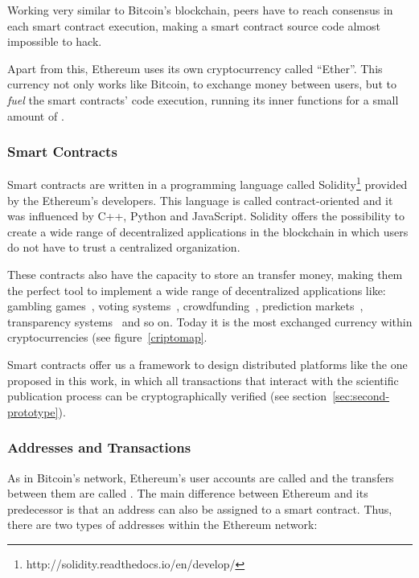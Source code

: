 Working very similar to Bitcoin's blockchain, peers have to reach consensus in
each smart contract execution, making a smart contract source code almost
impossible to hack.

Apart from this, Ethereum uses its own cryptocurrency called ``Ether''. This
currency not only works like Bitcoin, to exchange money between users, but to
\emph{fuel} the smart contracts' code execution, running its inner functions for
a small amount of .

\subsubsection*{Smart Contracts}
\label{tb:cryptos:sm}

Smart contracts are written in a programming language called
Solidity\footnote{http://solidity.readthedocs.io/en/develop/} provided by the
Ethereum's developers. This language is called contract-oriented and it was
influenced by C++, Python and JavaScript. Solidity offers the possibility to
create a wide range of decentralized applications in the blockchain in which
users do not have to trust a centralized organization.

These contracts also have the capacity to store an transfer money, making them
the perfect tool to implement a wide range of decentralized applications like:
gambling games~\cite{piasecki2016gaming}, voting
systems~\cite{mccorry2017smart}, crowdfunding~\cite{jacynycz2016betfunding},
prediction markets~\cite{peterson2015augur}, transparency
systems~\cite{bonneau2016ethiks} and so on. Today it is the most exchanged
currency within cryptocurrencies (see figure~\ref{criptomap}.

Smart contracts offer us a framework to design distributed platforms like the
one proposed in this work, in which all transactions that interact with the
scientific publication process can be cryptographically verified (see
section~\ref{sec:second-prototype}).

\subsubsection*{Addresses and Transactions}
\label{ts:at}

As in Bitcoin's network, Ethereum's user accounts are called  and
the transfers between them are called . The main difference
between Ethereum and its predecessor is that an address can also be assigned to
a smart contract. Thus, there are two types of addresses within the Ethereum
network:

